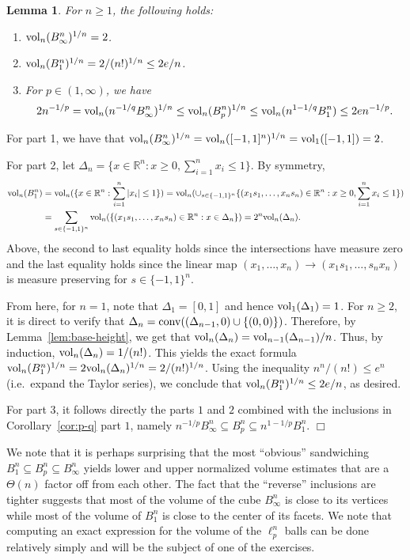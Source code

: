 \documentclass[11pt]{article}
\newtheorem{lemma}[theorem]{Lemma}
\theoremstyle{plain}
\newenvironment{proof}{\noindent {\sc Proof:}}{$\Box$ \medskip}
\theoremstyle{plain}
\newcommand{\set}[1]{\{{#1}\}}
\newcommand{\R}{\ensuremath{\mathbb{R}}}
\newcommand{\vol}{{\rm vol}}
\begin{document}
\begin{lemma} For $n \geq 1$, the following holds:
\begin{enumerate}
\item $\vol_n(B_\infty^n)^{1/n} = 2$.
\item $\vol_n(B_1^n)^{1/n} = 2/(n!)^{1/n} \leq 2e/n$.
\item For $p \in (1,\infty)$, we have
\[
2 n^{-1/p} = \vol_n(n^{-1/q} B_\infty^n)^{1/n} \leq {\rm
vol}_n(B_p^n)^{1/n} \leq \vol_n(n^{1-1/q} B_1^n) \leq 2e n^{-1/p}.
\] 
\end{enumerate}
\label{lem:vol-p}
\end{lemma}
\begin{proof}
For part 1, we have that $\vol_n(B_\infty^n)^{1/n} = \vol_n([-1,1]^n)^{1/n} =
\vol_1([-1,1]) = 2$. 

For part 2, let $\Delta_n = \set{x \in \R^n: x \geq 0, \sum_{i=1}^n x_i \leq
1}$. By symmetry, 
\begin{align*}
\vol_n(B_1^n) &= \vol_n(\set{x \in \R^n: \sum_{i=1}^n |x_i| \leq 1})
= \vol_n(\cup_{s \in \set{-1,1}^n} \set{(x_1 s_1, \dots, x_n s_n) \in \R^n: x
\geq 0, \sum_{i=1}^n x_i \leq 1}) \\
&= \sum_{s \in \set{-1,1}^n} \vol_n(\set{(x_1 s_1, \dots, x_n s_n) \in \R^n: x \in
\Delta_n})
= 2^n \vol_n(\Delta_n) .
\end{align*}
Above, the second to last equality holds since the intersections have measure zero and
the last equality holds since the linear map $(x_1,\dots,x_n)
\rightarrow (x_1 s_1,\dots,s_n x_n)$ is measure preserving for $s \in \set{-1,1}^n$. 

From here, for $n=1$, note that $\Delta_1 = [0,1]$ and hence ${\rm
vol}_1(\Delta_1) = 1$. For $n \geq 2$, it is direct to verify that $\Delta_n =
{\rm conv}((\Delta_{n-1},0) \cup \set{(0,0)})$. Therefore, by
Lemma~\ref{lem:base-height}, we get that $\vol_n(\Delta_n) =
\vol_{n-1}(\Delta_{n-1})/n$. Thus, by induction, $\vol_n(\Delta_n) = 1/(n!)$.
This yields the exact formula $\vol_n(B_1^n)^{1/n} = 2 \vol_n(\Delta_n)^{1/n} =
2/(n!)^{1/n}$. Using the inequality $n^n/(n!) \leq e^n$ (i.e.~expand the Taylor
series), we conclude that $\vol_n(B_1^n)^{1/n} \leq 2e/n$, as desired. 

For part $3$, it follows directly the parts $1$ and $2$ combined with the
inclusions in Corollary~\ref{cor:p-q} part $1$, namely $n^{-1/p} B_\infty^n
\subseteq B_p^n \subseteq n^{1-1/p} B_1^n$.
\end{proof}

We note that it is perhaps surprising that the most ``obvious'' sandwiching
$B_1^n \subseteq B_p^n \subseteq B_\infty^n$ yields lower and upper normalized
volume estimates that are a $\Theta(n)$ factor off from each other. The fact
that the ``reverse'' inclusions are tighter suggests that most of the volume of
the cube $B_\infty^n$ is close to its vertices while most of the volume of
$B_1^n$ is close to the center of its facets. We note that computing an exact
expression for the volume of the $\ell_p^n$ balls can be done relatively simply
and will be the subject of one of the exercises.
\end{document}
